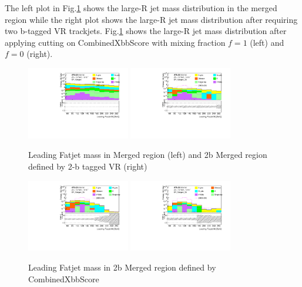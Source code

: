 \par The left plot in Fig.\ref{fig:mj_before} shows the large-R jet mass distribution in the merged region while the right plot shows the large-R jet mass distribution after requiring two b-tagged VR trackjets. 
Fig.\ref{fig:mj_before} shows the large-R jet mass distribution after applying cutting on CombinedXbbScore with mixing fraction $f=1$ (left) and $f=0$ (right). 	

\begin{figure}[h]
    \centering
    \includegraphics[width=0.4\textwidth]{appendices/figures/MC_MonoH_Nominal_SR_Merged_fatjets_m1_20GeV_LogY.pdf}
    \includegraphics[width=0.4\textwidth]{appendices/figures/MC_MonoH_Nominal_SR_Merged_2b_fatjets_m1_20GeV_LogY_vr.pdf}
    \caption{Leading Fatjet mass in Merged region (left) and 2b Merged region defined by 2-b tagged VR (right)}
    \label{fig:mj_before}
\end{figure}

\begin{figure}[h]
    \centering
    \includegraphics[width=0.4\textwidth]{appendices/figures/MC_MonoH_Nominal_SR_Merged_2b_fatjets_m1_20GeV_LogY_xbb.pdf}
    \includegraphics[width=0.4\textwidth]{appendices/figures/MC_MonoH_Nominal_SR_Merged_2b_fatjets_m1_20GeV_LogY_xbb_f0.pdf}
    \caption{Leading Fatjet mass in 2b Merged region defined by CombinedXbbScore}
    \label{fig:mj_after}
\end{figure}


